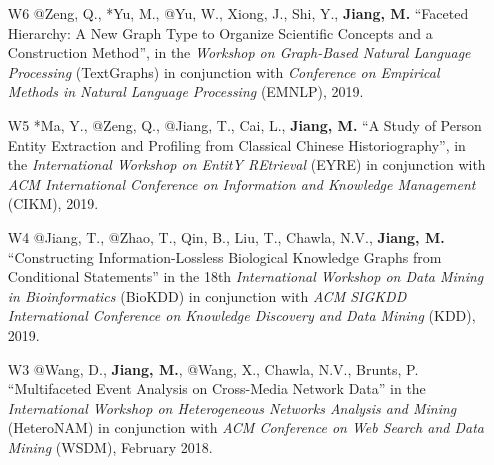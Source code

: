 \documentclass[10pt]{article}
\newenvironment{myindentpar}[1]%
{\begin{list}{}%
         {\setlength{\leftmargin}{#1}}%
         \item[]%
}
{\end{list}}
\newcounter{list}
\newcommand{\hide}[1]{}
\begin{document}
\begin{myindentpar}{0.00cm}
\begin{enumerate}[leftmargin=.5cm]
\item[W6] @Zeng, Q., *Yu, M., @Yu, W., Xiong, J., Shi, Y., \textbf{Jiang, M.} ``Faceted Hierarchy: A New Graph Type to Organize Scientific Concepts and a Construction Method'', in the \textit{Workshop on Graph-Based Natural Language Processing} (TextGraphs) in conjunction with \textit{Conference on Empirical Methods in Natural Language Processing} (EMNLP), 2019.

	\hide{\vspace{-0.1cm}\hspace{0.5cm}{\small \emph{I conceived the idea and wrote the paper. Mr. Zeng designed the study, and completed the experiments.}}}
	
\item[W5] *Ma, Y., @Zeng, Q., @Jiang, T., Cai, L., \textbf{Jiang, M.} ``A Study of Person Entity Extraction and Profiling from Classical Chinese Historiography'', in the \textit{International Workshop on EntitY REtrieval} (EYRE) in conjunction with \textit{ACM International Conference on Information and Knowledge Management} (CIKM), 2019.

	\hide{\vspace{-0.1cm}\hspace{0.5cm}{\small \emph{I conceived the idea. Mr. Ma designed the study, completed the experiments, and wrote the paper. I edited the paper.}}}

\item[W4] @Jiang, T., @Zhao, T., Qin, B., Liu, T., Chawla, N.V., \textbf{Jiang, M.} ``Constructing Information-Lossless Biological Knowledge Graphs from Conditional Statements'' in the 18th \textit{International Workshop on Data Mining in Bioinformatics} (BioKDD) in conjunction with \textit{ACM SIGKDD International Conference on Knowledge Discovery and Data Mining} (KDD), 2019.

	\hide{\vspace{-0.1cm}\hspace{0.5cm}{\small \emph{Mr. Jiang conceived the idea and wrote the paper. I edited the paper.}}}
	
\item[W3] @Wang, D., \textbf{Jiang, M.}, @Wang, X., Chawla, N.V., Brunts, P. ``Multifaceted Event Analysis on Cross-Media Network Data'' in the \textit{International Workshop on Heterogeneous Networks Analysis and Mining} (HeteroNAM) in conjunction with \textit{ACM Conference on Web Search and Data Mining} (WSDM), February 2018.

	\hide{\vspace{-0.1cm}\hspace{0.5cm}{\small \emph{I conceived the idea in consultation with Mr. Wang. Mr. Wang designed the study, completed the experiments, and wrote the paper. I edited the paper.}}}


\end{enumerate}
\end{myindentpar}
\end{document}
